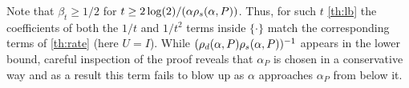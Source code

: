 Note that $\beta_t \ge 1/2$ for $t\ge2 \log(2)/(\alpha \rho_s(\alpha,P))$.
Thus, for such $t$ \cref{th:lb} 
the coefficients of both the $1/t$ and $1/t^2$ terms inside $\{ \cdot \}$ 
match the corresponding terms of \cref{th:rate} (here $U=I$).
While $(\rho_d(\alpha,P)\rho_s(\alpha,P))^{-1}$ appears in the lower bound, careful inspection
of the proof reveals that $\alpha_P$ is chosen in a conservative way 
and as a result this term fails to blow up as $\alpha$ approaches $\alpha_P$ from below it.



